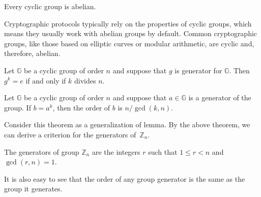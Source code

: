 \documentclass[../lecture-notes-148x210.tex]{subfiles}
\begin{document}
\begin{theorem}
    Every cyclic group is abelian.
\end{theorem}

Cryptographic protocols typically rely on the properties of cyclic groups, which means they 
usually work with abelian groups by default. Common cryptographic groups, like those based 
on elliptic curves or modular arithmetic, are cyclic and, therefore, abelian.


\begin{lemma}
    Let $\mathbb{G}$ be a cyclic group of order $n$ and suppose that $g$ is generator for $\mathbb{G}$.
    Then $g^{k} = e$ if and only if $k$ divides $n$.
\end{lemma}

\begin{theorem}
    Let $\mathbb{G}$ be a cyclic group of order $n$ and suppose that $a \in \mathbb{G}$ is a generator
    of the group. If $b = a^{k}$, then the order of $b$ is $n/\gcd(k, n)$. 
\end{theorem}

Consider this theorem as a generalization of lemma. By the above theorem, 
we can derive a criterion for the generators of~$\mathbb{Z}_n$.

\begin{corollary} \label{cor:}
    The generators of group $\mathbb{Z}_n$ are the integers $r$ such that $1 \leq r < n$ and $\gcd(r, n) = 1$. 
\end{corollary}

It is also easy to see that the order of any group generator is the same as the group it generates.
\end{document}
